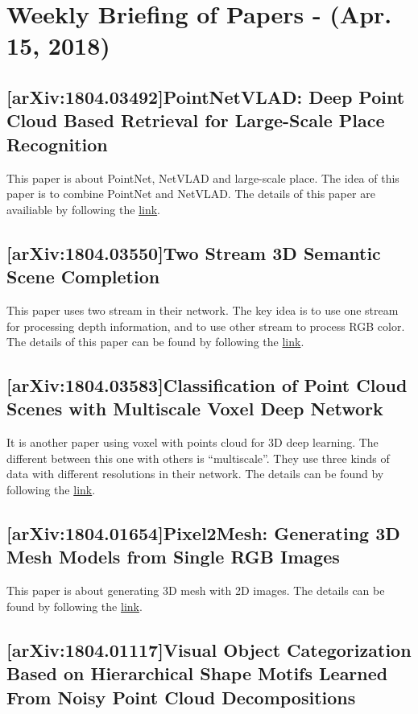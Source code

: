 \section{Weekly Briefing of Papers - (Apr. 15, 2018)}

\subsection{[arXiv:1804.03492]PointNetVLAD: Deep Point Cloud Based Retrieval for
  Large-Scale Place Recognition}

This paper is about PointNet, NetVLAD and large-scale place. The idea of this
paper is to combine PointNet and NetVLAD.
The details of this paper are availiable by following the
\href{https://arxiv.org/abs/1804.03492}{link}.

\subsection{[arXiv:1804.03550]Two Stream 3D Semantic Scene Completion}

This paper uses two stream in their network. The key idea is to use one stream
for processing depth information, and to use other stream to process RGB color.
The details of this paper can be found by following the
\href{https://arxiv.org/abs/1804.03550}{link}.

\subsection{[arXiv:1804.03583]Classification of Point Cloud Scenes with
  Multiscale Voxel Deep Network}

It is another paper using voxel with points cloud for 3D deep learning.
The different between this one with others is ``multiscale''.
They use three kinds of data with different resolutions in their network.
The details can be found by following the \href{https://arxiv.org/abs/1804.03583}{link}.

\subsection{[arXiv:1804.01654]Pixel2Mesh: Generating 3D Mesh Models from Single
  RGB Images}

This paper is about generating 3D mesh with 2D images.
The details can be found by following the
\href{https://arxiv.org/abs/1804.01654}{link}.

\subsection{[arXiv:1804.01117]Visual Object Categorization Based on Hierarchical
  Shape Motifs Learned From Noisy Point Cloud Decompositions}

